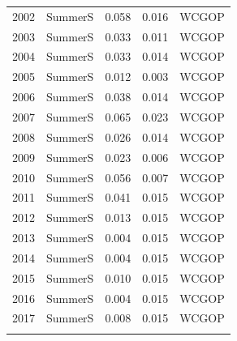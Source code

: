 \documentclass[12pt,]{article}
\begin{document}
\begin{longtable}{crrrr}
  2002 & SummerS & 0.058 & 0.016 & WCGOP \\ 
  2003 & SummerS & 0.033 & 0.011 & WCGOP \\ 
  2004 & SummerS & 0.033 & 0.014 & WCGOP \\ 
  2005 & SummerS & 0.012 & 0.003 & WCGOP \\ 
  2006 & SummerS & 0.038 & 0.014 & WCGOP \\ 
  2007 & SummerS & 0.065 & 0.023 & WCGOP \\ 
  2008 & SummerS & 0.026 & 0.014 & WCGOP \\ 
  2009 & SummerS & 0.023 & 0.006 & WCGOP \\ 
  2010 & SummerS & 0.056 & 0.007 & WCGOP \\ 
  2011 & SummerS & 0.041 & 0.015 & WCGOP \\ 
  2012 & SummerS & 0.013 & 0.015 & WCGOP \\ 
  2013 & SummerS & 0.004 & 0.015 & WCGOP \\ 
  2014 & SummerS & 0.004 & 0.015 & WCGOP \\ 
  2015 & SummerS & 0.010 & 0.015 & WCGOP \\ 
  2016 & SummerS & 0.004 & 0.015 & WCGOP \\ 
  2017 & SummerS & 0.008 & 0.015 & WCGOP \\ 
   \hline
\hline
\label{tab:Discard}
\end{longtable}

\FloatBarrier

\newpage
\end{document}
